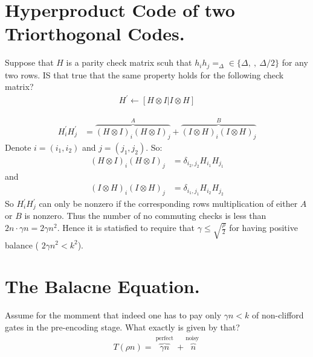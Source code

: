 \section{Hyperproduct Code of two Triorthogonal Codes.}

Suppose that $H$ is a parity check matrix scuh that $h_{i}h_{j} =_{\Delta} \in
\{\Delta , \ , \ \Delta/2 \}$ for any two rows. IS that true that the same
property holds for the following check matrix?
\begin{equation*}
  \begin{split}
    H^{\prime} \leftarrow [ H \otimes I | I \otimes H ]
  \end{split}
\end{equation*}

\begin{equation*}
  \begin{split}
    H^{\prime}_{i}H^{\prime}_{j} &= \overbrace{ (H\otimes I)_{i}(H\otimes
    I)_{j}}^{A} + \overbrace{(I \otimes H)_{i}(I \otimes H)_{j}}^{B}
  \end{split}
\end{equation*}
Denote $i = (i_{1},i_{2})$ and $j = (j_{1},j_{2})$. So:
\begin{equation*}
  \begin{split}
    (H\otimes I)_{i}(H\otimes I)_{j} &= \delta_{i_{2},j_{2}} H_{i_{1}}H_{j_{1}}
  \end{split}
\end{equation*}
and
\begin{equation*}
  \begin{split}
    (I \otimes H)_{i}(I \otimes H)_{j} &= \delta_{i_{1},j_{1}}
    H_{i_{2}}H_{j_{2}}
  \end{split}
\end{equation*}
So $H^{\prime}_{i}H^{\prime}_{j}$ can only be nonzero if the corresponding rows
multiplication of either $A$ or $B$ is nonzero. Thus the number of no
commuting checks is less than  $2n\cdot\gamma n = 2\gamma n^{2}$. Hence it is
statisfied to require that $\gamma \le \sqrt{\frac{\rho}{2}}$ for having
positive balance ( $2\gamma n^{2} < k^{2} $).

\section{The Balacne Equation.}
Assume for the momment that indeed one has to pay only $\gamma n < k $ of
non-clifford gates in the pre-encoding stage. What exactly is given by that?
\begin{equation*}
  \begin{split}
    T(\rho n) = \overbrace{\gamma n}^{\text{ perfect }} +\overbrace{n}^{\text{
    noisy }}
  \end{split}
\end{equation*}

